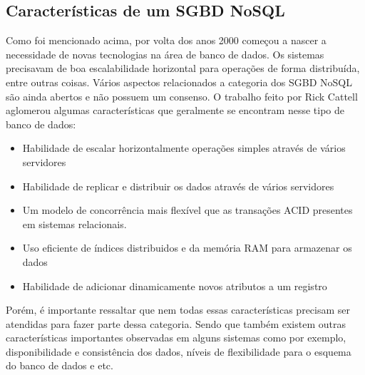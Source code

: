 \subsection{Características de um SGBD NoSQL}
	Como foi mencionado acima, por volta dos anos 2000 começou a nascer a necessidade de novas tecnologias na área de banco de dados. Os sistemas precisavam de boa escalabilidade horizontal para operações de forma distribuída, entre outras coisas. Vários aspectos relacionados a categoria dos SGBD NoSQL são ainda abertos e não possuem um consenso. O trabalho feito por Rick Cattell\cite{Cattell:2011:SSN:1978915.1978919} aglomerou algumas características que geralmente se encontram nesse tipo de banco de dados: 
	\begin{itemize}
		\item Habilidade de escalar horizontalmente operações simples através de vários servidores
		\item Habilidade de replicar e distribuir os dados através de vários servidores
		\item Um modelo de concorrência mais flexível que as transações ACID presentes em sistemas relacionais.
		\item Uso eficiente de índices distribuidos e da memória RAM para armazenar os dados
		\item Habilidade de adicionar dinamicamente novos atributos a um registro
	\end{itemize}
	
	Porém, é importante ressaltar que nem todas essas características precisam ser atendidas para fazer parte dessa categoria. Sendo que também existem outras características importantes observadas em alguns sistemas como por exemplo, disponibilidade e consistência dos dados, níveis de flexibilidade para o esquema do banco de dados e etc.

